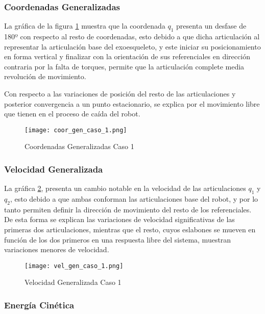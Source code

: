     \subsubsection{Coordenadas Generalizadas}
    La gráfica de la figura \ref{fig:CoordGenC1} muestra que la coordenada 
    $q_1$ presenta un desfase de 180º con respecto al resto de coordenadas, esto debido 
    a que dicha articulación al representar la articulación base del exoesqueleto, y este 
    iniciar su posicionamiento en forma vertical y finalizar con la orientación de sus 
    referenciales en dirección contraria por la falta de torques, permite que la articulación 
    complete media revolución de movimiento.

    Con respecto a las variaciones de posición del resto de las articulaciones 
    y posterior convergencia a un punto estacionario, se explica por el movimiento 
    libre que tienen en el proceso de caída del robot.
    \begin{figure} [H]%
            \centering
            \texttt{[image: coor\_gen\_caso\_1.png]} 
        \caption{Coordenadas Generalizadas Caso 1}
        \label{fig:CoordGenC1}
    \end{figure}

    \subsubsection{Velocidad Generalizada}
    La gráfica \ref{fig:VelGenC1}, presenta un cambio notable en la velocidad 
    de las articulaciones $q_1$ y $q_2$, esto debido a que ambas conforman 
    las articulaciones base del robot, y por lo tanto permiten definir la dirección 
    de movimiento del resto de los referenciales. De esta forma se explican las 
    variaciones de velocidad significativas de las primeras dos articulaciones, 
    mientras que el resto, cuyos eslabones se mueven en función de los dos primeros 
    en una respuesta libre del sistema, muestran variaciones menores de velocidad.

    \begin{figure}[H]%
            \centering
            \texttt{[image: vel\_gen\_caso\_1.png]} 
        \caption{Velocidad Generalizada Caso 1}
        \label{fig:VelGenC1}
    \end{figure}

    \subsubsection{Energía Cinética}


